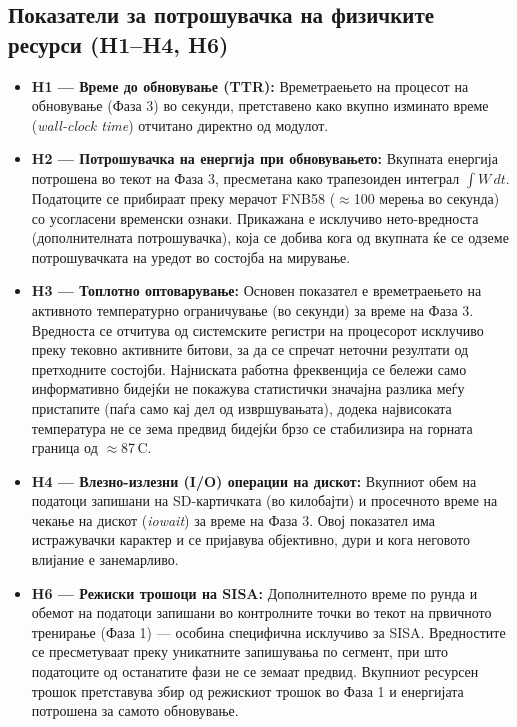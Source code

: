 \subsection{Показатели за потрошувачка на физичките ресурси (H1--H4, H6)}
\begin{itemize}
  \item \textbf{H1 --- Време до обновување (TTR):} Времетраењето на процесот на обновување (Фаза 3) во секунди, претставено како вкупно изминато време (\emph{wall-clock time}) отчитано директно од модулот.
  \item \textbf{H2 --- Потрошувачка на енергија при обновувањето:} Вкупната енергија потрошена во текот на Фаза 3, пресметана како трапезоиден интеграл $\int W\,dt$. Податоците се прибираат преку мерачот FNB58 ($\approx$100 мерења во секунда) со усогласени временски ознаки. Прикажана е исклучиво нето-вредноста (дополнителната потрошувачка), која се добива кога од вкупната ќе се одземе потрошувачката на уредот во состојба на мирување.
  \item \textbf{H3 --- Топлотно оптоварување:} Основен показател е времетраењето на активното температурно ограничување (во секунди) за време на Фаза 3. Вредноста се отчитува од системските регистри на процесорот исклучиво преку тековно активните битови, за да се спречат неточни резултати од претходните состојби. Најниската работна фреквенција се бележи само информативно бидејќи не покажува статистички значајна разлика меѓу пристапите (паѓа само кај дел од извршувањата), додека највисоката температура не се зема предвид бидејќи брзо се стабилизира на горната граница од $\approx$87\,\textdegree C.
  \item \textbf{H4 --- Влезно-излезни (I/O) операции на дискот:} Вкупниот обем на податоци запишани на SD-картичката (во килобајти) и просечното време на чекање на дискот (\emph{iowait}) за време на Фаза 3. Овој показател има истражувачки карактер и се пријавува објективно, дури и кога неговото влијание е занемарливо.
  \item \textbf{H6 --- Режиски трошоци на SISA:} Дополнителното време по рунда и обемот на податоци запишани во контролните точки во текот на првичното тренирање (Фаза 1) — особина специфична исклучиво за SISA. Вредностите се пресметуваат преку уникатните запишувања по сегмент, при што податоците од останатите фази не се земаат предвид. Вкупниот ресурсен трошок претставува збир од режискиот трошок во Фаза 1 и енергијата потрошена за самото обновување.
\end{itemize}


